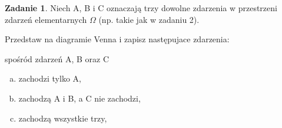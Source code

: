 \documentclass[11pt]{article}
\theoremstyle{definition}
\newtheorem{zadanie}{Zadanie}
\numberwithin{zadanie}{section}
\begin{document}
\begin{zadanie}
    Niech A, B i C oznaczają trzy dowolne zdarzenia w przestrzeni zdarzeń elementarnych $\Omega$ (np. takie jak w zadaniu 2).

    Przedstaw na diagramie Venna i zapisz następujace zdarzenia:

    spośród zdarzeń A, B oraz C

    \begin{enumerate}[a)]
        \item zachodzi tylko A,

              \def\A{(0,0) circle (1.5cm)}
              \def\B{(60:2cm) circle (1.5cm)}
              \def\C{(0:2cm) circle (1.5cm)}

              \def\Z{(-2, -2) rectangle (4,4)}


        \item zachodzą A i B, a C nie zachodzi,


        \item zachodzą wszystkie trzy,



\end{enumerate}
\end{zadanie}
\end{document}
